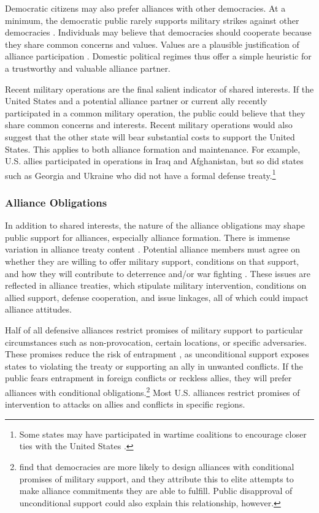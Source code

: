 \documentclass[12pt]{article}
\begin{document}
Democratic citizens may also prefer alliances with other democracies. 
At a minimum, the democratic public rarely supports military strikes against other democracies \citep{TomzWeeks2013}. 
Individuals may believe that democracies should cooperate because they share common concerns and values. 
Values are a plausible justification of alliance participation \citep{Chuetal2021}. 
Domestic political regimes thus offer a simple heuristic for a trustworthy and valuable alliance partner. 


Recent military operations are the final salient indicator of shared interests. 
If the United States and a potential alliance partner or current ally recently participated in a common military operation, the public could believe that they share common concerns and interests. 
Recent military operations would also suggest that the other state will bear substantial costs to support the United States. 
This applies to both alliance formation and maintenance. 
For example, U.S. allies participated in operations in Iraq and Afghanistan, but so did states such as Georgia and Ukraine who did not have a formal defense treaty.\footnote{Some states may have participated in wartime coalitions to encourage closer ties with the United States \citep{GannonKent2020}.}



\subsubsection*{Alliance Obligations}


In addition to shared interests, the nature of the alliance obligations may shape public support for alliances, especially alliance formation. 
There is immense variation in alliance treaty content \citep{Leedsetal2002}.
Potential alliance members must agree on whether they are willing to offer military support, conditions on that support, and how they will contribute to deterrence and/or war fighting \citep{Poast2019a}. 
These issues are reflected in alliance treaties, which stipulate military intervention, conditions on allied support, defense cooperation, and issue linkages, all of which could impact alliance attitudes. 


Half of all defensive alliances restrict promises of military support to particular circumstances such as non-provocation, certain locations, or specific adversaries. 
These promises reduce the risk of entrapment \citep{Benson2012}, as unconditional support exposes states to violating the treaty or supporting an ally in unwanted conflicts.
If the public fears entrapment in foreign conflicts or reckless allies, they will prefer alliances with conditional obligations.\footnote{\citep{Chibaetal2015} find that democracies are more likely to design alliances with conditional promises of military support, and they attribute this to elite attempts to make alliance commitments they are able to fulfill. Public disapproval of unconditional support could also explain this relationship, however.}
Most U.S. alliances restrict promises of intervention to attacks on allies and conflicts in specific regions. 
\end{document}
